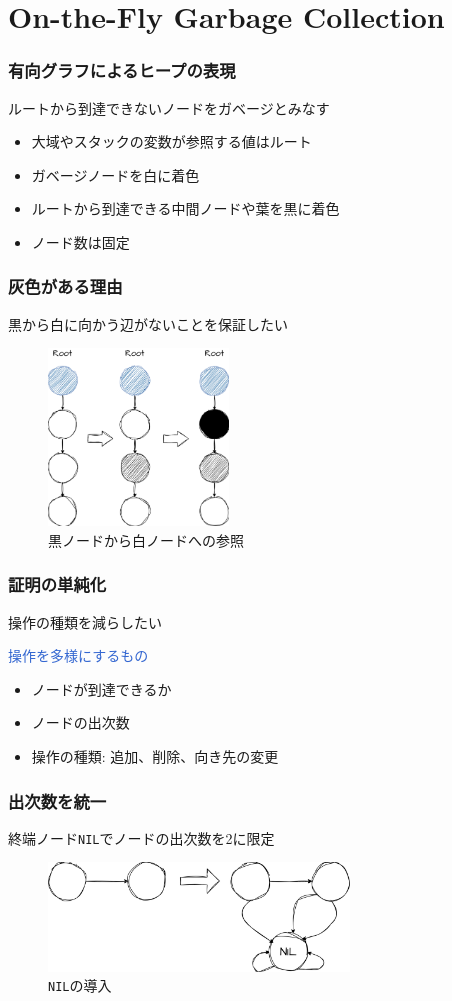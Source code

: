 \documentclass[unicode, 14pt, aspectratio=169]{beamer}
\begin{document}
\section{On-the-Fly Garbage Collection}
\begin{frame}
  \frametitle{有向グラフによるヒープの表現}
  {\large ルートから到達できないノードをガベージとみなす}
  \begin{itemize}
  \item 大域やスタックの変数が参照する値はルート
  \item ガベージノードを白に着色
  \item ルートから到達できる中間ノードや葉を黒に着色
  \item ノード数は固定
  \end{itemize}
\end{frame}
\begin{frame}
  \frametitle{灰色がある理由}
  {\large 黒から白に向かう辺がないことを保証したい}
  \par
  \begin{figure}[h]
    \includegraphics[width=4.8cm]{./img/black-white.png}
    \caption[memory]{黒ノードから白ノードへの参照}
    \label{fig:black-white}
  \end{figure}
\end{frame}
\begin{frame}
  \frametitle{証明の単純化}
  {\large 操作の種類を減らしたい}
  \par
  \vspace{12pt}
  \textcolor{highlight}{操作を多様にするもの}
  \begin{itemize}
  \item ノードが到達できるか
  \item ノードの出次数
  \item 操作の種類: 追加、削除、向き先の変更
  \end{itemize}
\end{frame}
\begin{frame}
  \frametitle{出次数を統一}
  {\large 終端ノード\texttt{NIL}でノードの出次数を2に限定}
  \begin{figure}[h]
    \includegraphics[width=8cm]{./img/nil.png}
    \caption[memory]{\texttt{NIL}の導入}
    \label{fig:nil}
  \end{figure}  
\end{frame}
\end{document}
